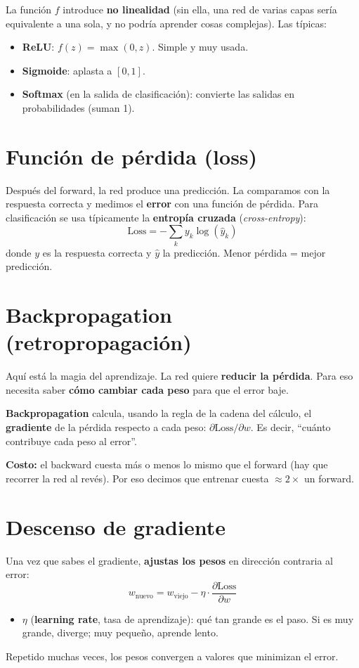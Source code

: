 \documentclass[11pt,a4paper]{article}
\newcommand{\term}[1]{\textbf{\textcolor{clave}{#1}}}
\begin{document}
La función $f$ introduce \textbf{no linealidad} (sin ella, una red de varias
capas sería equivalente a una sola, y no podría aprender cosas complejas). Las
típicas:
\begin{itemize}
  \item \term{ReLU}: $f(z)=\max(0,z)$. Simple y muy usada.
  \item \term{Sigmoide}: aplasta a $[0,1]$.
  \item \term{Softmax} (en la salida de clasificación): convierte las salidas en
        probabilidades (suman 1).
\end{itemize}

\section{Función de pérdida (loss)}

Después del forward, la red produce una predicción. La comparamos con la
respuesta correcta y medimos el \textbf{error} con una función de pérdida. Para
clasificación se usa típicamente la \term{entropía cruzada} (\emph{cross-entropy}):
\[
\text{Loss} = -\sum_k y_k \log(\hat{y}_k)
\]
donde $y$ es la respuesta correcta y $\hat{y}$ la predicción. Menor pérdida =
mejor predicción.

\section{Backpropagation (retropropagación)}

Aquí está la magia del aprendizaje. La red quiere \textbf{reducir la pérdida}.
Para eso necesita saber \textbf{cómo cambiar cada peso} para que el error baje.

\term{Backpropagation} calcula, usando la regla de la cadena del cálculo, el
\textbf{gradiente} de la pérdida respecto a cada peso: $\partial \text{Loss}/
\partial w$. Es decir, ``cuánto contribuye cada peso al error''.

\textbf{Costo:} el backward cuesta más o menos lo mismo que el forward (hay que
recorrer la red al revés). Por eso decimos que entrenar cuesta $\approx 2\times$
un forward.

\section{Descenso de gradiente}

Una vez que sabes el gradiente, \textbf{ajustas los pesos} en dirección contraria
al error:
\[
w_{\text{nuevo}} = w_{\text{viejo}} - \eta \cdot \frac{\partial \text{Loss}}{\partial w}
\]
\begin{itemize}
  \item $\eta$ (\term{learning rate}, tasa de aprendizaje): qué tan grande es el
        paso. Si es muy grande, diverge; muy pequeño, aprende lento.
\end{itemize}
Repetido muchas veces, los pesos convergen a valores que minimizan el error.
\end{document}
